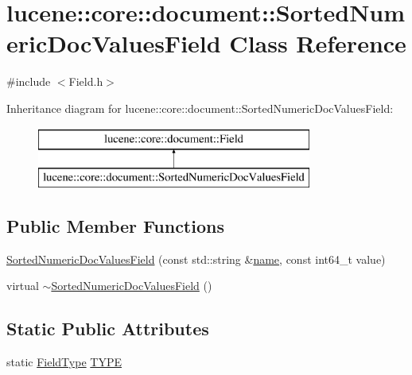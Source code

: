 \hypertarget{classlucene_1_1core_1_1document_1_1SortedNumericDocValuesField}{}\section{lucene\+:\+:core\+:\+:document\+:\+:Sorted\+Numeric\+Doc\+Values\+Field Class Reference}
\label{classlucene_1_1core_1_1document_1_1SortedNumericDocValuesField}


{\ttfamily \#include $<$Field.\+h$>$}

Inheritance diagram for lucene\+:\+:core\+:\+:document\+:\+:Sorted\+Numeric\+Doc\+Values\+Field\+:\begin{figure}[H]
\begin{center}
\leavevmode
\includegraphics[height=2.000000cm]{classlucene_1_1core_1_1document_1_1SortedNumericDocValuesField}
\end{center}
\end{figure}
\subsection*{Public Member Functions}
\begin{DoxyCompactItemize}
\item 
\mbox{\hyperlink{classlucene_1_1core_1_1document_1_1SortedNumericDocValuesField_a671e8bf15e95e893c228a4dec124f690}{Sorted\+Numeric\+Doc\+Values\+Field}} (const std\+::string \&\mbox{\hyperlink{classlucene_1_1core_1_1document_1_1Field_a52f673f3b3abb14b180f5159f4726537}{name}}, const int64\+\_\+t value)
\item 
virtual \mbox{\hyperlink{classlucene_1_1core_1_1document_1_1SortedNumericDocValuesField_a9e5f61fdd8fecb71c2148a896bf6ba26}{$\sim$\+Sorted\+Numeric\+Doc\+Values\+Field}} ()
\end{DoxyCompactItemize}
\subsection*{Static Public Attributes}
\begin{DoxyCompactItemize}
\item 
static \mbox{\hyperlink{classlucene_1_1core_1_1document_1_1FieldType}{Field\+Type}} \mbox{\hyperlink{classlucene_1_1core_1_1document_1_1SortedNumericDocValuesField_a65165dc2b4de45408cccb373f92a1334}{T\+Y\+PE}}
\end{DoxyCompactItemize}
